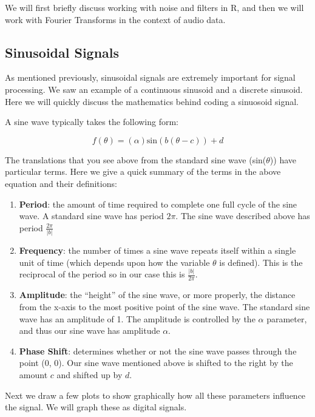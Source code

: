 \documentclass[
]{krantz}
\providecommand{\tightlist}{%
  \setlength{\itemsep}{0pt}\setlength{\parskip}{0pt}}
\begin{document}
We will first briefly discuss working with noise and filters in R, and then we will work with Fourier Transforms in the context of audio data.

\hypertarget{sinusoidal-signals}{%
\subsection{Sinusoidal Signals}\label{sinusoidal-signals}}

As mentioned previously, sinusoidal signals are extremely important for signal processing. We saw an example of a continuous sinusoid and a discrete sinusoid. Here we will quickly discuss the mathematics behind coding a sinuosoid signal.

A sine wave typically takes the following form:

\[
f(\theta) = (\alpha) \text{sin}(b(\theta - c)) + d
\]

The translations that you see above from the standard sine wave (sin(\(\theta\))) have particular terms. Here we give a quick summary of the terms in the above equation and their definitions:

\begin{enumerate}
\def\labelenumi{\arabic{enumi}.}
\tightlist
\item
  \textbf{Period}: the amount of time required to complete one full cycle of the sine wave. A standard sine wave has period \(2\pi\). The sine wave described above has period \(\frac{2\pi}{|b|}\)
\item
  \textbf{Frequency}: the number of times a sine wave repeats itself within a single unit of time (which depends upon how the variable \(\theta\) is defined). This is the reciprocal of the period so in our case this is \(\frac{|b|}{2\pi}\).
\item
  \textbf{Amplitude}: the ``height'' of the sine wave, or more properly, the distance from the x-axis to the most positive point of the sine wave. The standard sine wave has an amplitude of 1. The amplitude is controlled by the \(\alpha\) parameter, and thus our sine wave has amplitude \(\alpha\).
\item
  \textbf{Phase Shift}: determines whether or not the sine wave passes through the point (0, 0). Our sine wave mentioned above is shifted to the right by the amount \(c\) and shifted up by \(d\).
\end{enumerate}

Next we draw a few plots to show graphically how all these parameters influence the signal. We will graph these as digital signals.
\end{document}
